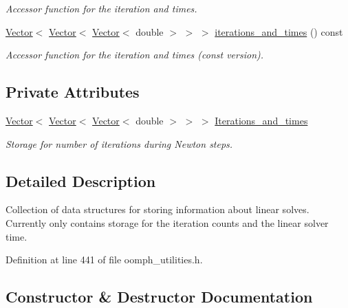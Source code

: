\begin{DoxyCompactItemize}
\begin{DoxyCompactList}\small\item\em Accessor function for the iteration and times. \end{DoxyCompactList}\item 
\hyperlink{classoomph_1_1Vector}{Vector}$<$ \hyperlink{classoomph_1_1Vector}{Vector}$<$ \hyperlink{classoomph_1_1Vector}{Vector}$<$ double $>$ $>$ $>$ \hyperlink{classoomph_1_1DocLinearSolverInfo_afc670ed88962229cece84f7b8b2460ff}{iterations\+\_\+and\+\_\+times} () const
\begin{DoxyCompactList}\small\item\em Accessor function for the iteration and times (const version). \end{DoxyCompactList}\end{DoxyCompactItemize}
\subsection*{Private Attributes}
\begin{DoxyCompactItemize}
\item 
\hyperlink{classoomph_1_1Vector}{Vector}$<$ \hyperlink{classoomph_1_1Vector}{Vector}$<$ \hyperlink{classoomph_1_1Vector}{Vector}$<$ double $>$ $>$ $>$ \hyperlink{classoomph_1_1DocLinearSolverInfo_a39f9368b84a0247ec2aec6dd0b759c52}{Iterations\+\_\+and\+\_\+times}
\begin{DoxyCompactList}\small\item\em Storage for number of iterations during Newton steps. \end{DoxyCompactList}\end{DoxyCompactItemize}


\subsection{Detailed Description}
Collection of data structures for storing information about linear solves. Currently only contains storage for the iteration counts and the linear solver time. 

Definition at line 441 of file oomph\+\_\+utilities.\+h.



\subsection{Constructor \& Destructor Documentation}
\mbox{\label{classoomph_1_1DocLinearSolverInfo_a9b0ce2e30cd7bb85473d1b057763cd23}} 
